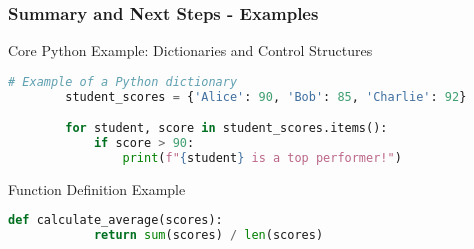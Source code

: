 \documentclass[aspectratio=169]{beamer}
\begin{document}
\begin{frame}[fragile]
    \frametitle{Summary and Next Steps - Examples}
    \begin{block}{Core Python Example: Dictionaries and Control Structures}
        \begin{lstlisting}[language=Python]
        # Example of a Python dictionary
        student_scores = {'Alice': 90, 'Bob': 85, 'Charlie': 92}

        for student, score in student_scores.items():
            if score > 90:
                print(f"{student} is a top performer!")
        \end{lstlisting}
    \end{block}
    
    \begin{block}{Function Definition Example}
        \begin{lstlisting}[language=Python]
        def calculate_average(scores):
            return sum(scores) / len(scores)
        \end{lstlisting}
    \end{block}
\end{frame}
\end{document}
